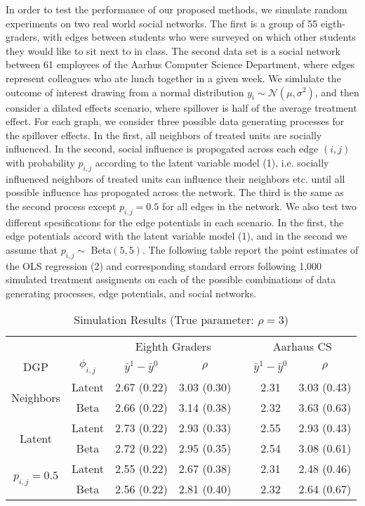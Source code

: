 \documentclass{article}
\begin{document}
In order to test the performance of our proposed methods, we simulate random experiments on two real world social networks. The first is a group of 55 eigth-graders, with edges between 
students who were surveyed on which other students they would like to sit next to in class. The second data set is a social network between 61 employees of the Aarhus Computer Science Department, where 
edges represent colleagues who ate lunch together in a given week. We simlulate the outcome of interest drawing from a normal distribution $y_{i} \sim \mathcal{N}(\mu, \sigma^2)$, and then consider a dilated effects scenario, 
where spillover is half of the average treatment effect. For each graph, we consider three possible data generating processes for the spillover effects. In the first, all neighbors of treated units are socially influenced. 
In the second, social influence is propogated across each edge $(i, j)$ with probability $p_{i,j}$ according to the latent variable model (1), i.e. socially influenced neighbors of treated units can influence their neighbors etc. until all possible influence
has propogated across the network. The third is the same as the second process except $p_{i,j} = 0.5$ for all edges in the network. We also test two different spesifications for the edge potentials in each scenario. In the first, the edge potentials accord with the latent variable model (1), and in the second we assume that $p_{i,j} \sim$ Beta$(5, 5)$. The following table report the point estimates of the OLS regression (2) and corresponding standard errors following 1,000 simulated 
treatment assigments on each of the possible combinations of data generating processes, edge potentials, and social networks. 
\begin{table}[htbp]
  \caption{Simulation Results (True parameter: $\rho = 3$)}
  \label{table1}
  \centering
  \begin{tabular}{ccccccc}
    \toprule
    & & \multicolumn{2}{c}{Eighth Graders} & & \multicolumn{2}{c}{Aarhaus CS}              \\
    \cmidrule{3-4} \cmidrule{6-7}
    DGP & $\phi_{i,j}$ & $\bar{y}^1 - \bar{y}^0$ & $\rho$ & & $\bar{y}^1 - \bar{y}^0$ & $\rho$ \\
    \midrule
    \multirow{ 2}{*}{Neighbors} & Latent & 2.67 (0.22) & 3.03 (0.30) & & 2.31 & 3.03 (0.43)    \\
    \cmidrule{2-7}
    & Beta & 2.66 (0.22) & 3.14 (0.38) & & 2.32 & 3.63 (0.63)  \\
    \midrule
    \multirow{ 2}{*}{Latent}& Latent & 2.73 (0.22) & 2.93 (0.33)  & & 2.55 & 2.93 (0.43)  \\
    \cmidrule{2-7}
    & Beta  & 2.72 (0.22) & 2.95 (0.35)  & & 2.54 & 3.08 (0.61) \\
    \midrule
    \multirow{ 2}{*}{$p_{i,j} = 0.5$}& Latent & 2.55 (0.22) & 2.67 (0.38)  & & 2.31 & 2.48 (0.46) \\
    \cmidrule{2-7} 
    & Beta  & 2.56 (0.22)& 2.81 (0.40)  & & 2.32 & 2.64 (0.67)  \\
    \bottomrule
  \end{tabular}
\end{table}
\end{document}
